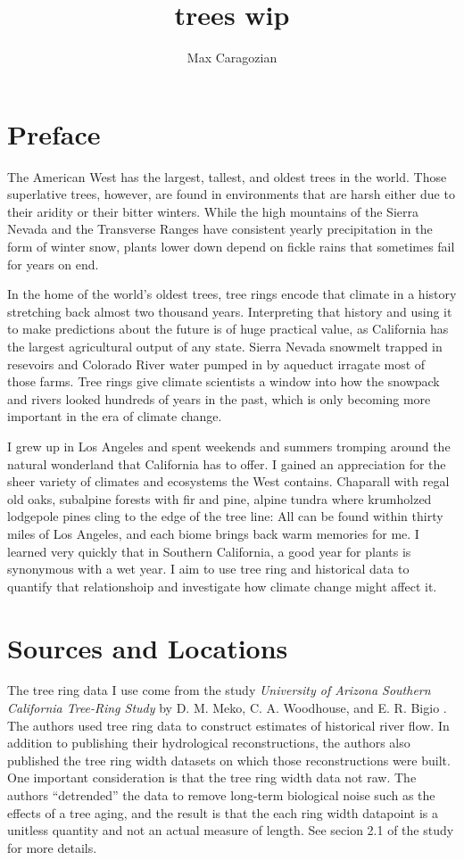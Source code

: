 \documentclass[]{article}
\title{trees wip}
\author{Max Caragozian}
\begin{document}
	


\maketitle

\section{Preface}
The  American West has the largest, tallest, and oldest trees in the world. Those superlative trees, however, are found in environments that are harsh either due to their aridity or their bitter winters. While the high mountains of the Sierra Nevada and the Transverse Ranges have consistent yearly precipitation in the form of winter snow, plants lower down depend on fickle rains that sometimes fail for years on end.

In the home of the world's oldest trees, tree rings encode that climate in a history stretching back almost two thousand years. Interpreting that history and using it to make predictions about the future is of huge practical value, as California has the largest agricultural output of any state. Sierra Nevada snowmelt trapped in resevoirs and Colorado River water pumped in by aqueduct irragate most of those farms. Tree rings give climate scientists a window into how the snowpack and rivers looked hundreds of years in the past, which is only becoming more important in the era of climate change.

I grew up in Los Angeles and spent weekends and summers tromping around the natural wonderland that California has to offer. I gained an appreciation for the sheer variety of climates and ecosystems the West contains. Chaparall with regal old oaks, subalpine forests with fir and pine, alpine tundra where krumholzed lodgepole pines cling to the edge of the tree line: All can be found within thirty miles of Los Angeles, and each biome brings back warm memories for me. I learned very quickly that in Southern California, a good year for plants is synonymous with a wet year. I aim to use tree ring and historical data to quantify that relationshoip and investigate how climate change might affect it. 

\section{Sources and Locations}
The tree ring data I use come from the study \textit{University of Arizona Southern California Tree-Ring Study} by D. M. Meko, C. A. Woodhouse, and E. R. Bigio \cite{tree_study}. The authors used tree ring data to construct estimates of historical river flow. In addition to publishing their hydrological reconstructions, the authors also published the tree ring width datasets on which those reconstructions were built. One important consideration is that the tree ring width data not raw. The authors ``detrended'' the data to remove long-term biological noise such as the effects of a tree aging, and the result is that the each ring width datapoint is a unitless quantity and not an actual measure of length. See secion 2.1 of the study for more details\cite{tree_study}.
\end{document}
